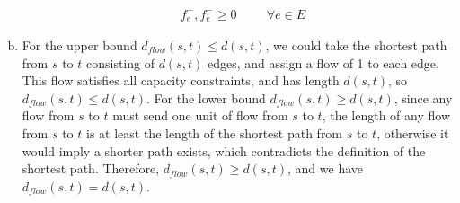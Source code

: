 \documentclass[10pt]{article}
\begin{document}
\begin{solution}
\begin{enumerate}[(a)]
\begin{align*}
            & f_e^+, f_e^- \geq 0 \hspace{1cm} \forall e \in E
        \end{align*}
        \item For the upper bound $d_{flow}(s,t) \leq d(s,t)$, we could take the shortest path from $s$ to $t$ consisting of $d(s,t)$ edges, and assign a flow of 1 to each edge. This flow satisfies all capacity constraints, and has length $d(s,t)$, so $d_{flow}(s,t) \leq d(s,t)$. For the lower bound $d_{flow}(s,t) \geq d(s,t)$, since any flow from $s$ to $t$ must send one unit of flow from $s$ to $t$, the length of any flow from $s$ to $t$ is at least the length of the shortest path from $s$ to $t$, otherwise it would imply a shorter path exists, which contradicts the definition of the shortest path. Therefore, $d_{flow}(s,t) \geq d(s,t)$, and we have $d_{flow}(s,t) = d(s,t)$.
    \end{enumerate}
\end{solution}


\newpage

\end{document}
